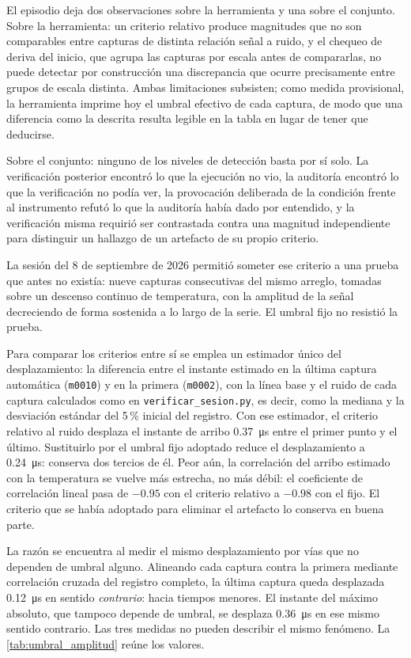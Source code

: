 El episodio deja dos observaciones sobre la herramienta y una sobre el
conjunto. Sobre la herramienta: un criterio relativo produce magnitudes
que no son comparables entre capturas de distinta relación señal a
ruido, y el chequeo de deriva del inicio, que agrupa las capturas por
escala antes de compararlas, no puede detectar por construcción una
discrepancia que ocurre precisamente entre grupos de escala distinta.
Ambas limitaciones subsisten; como medida provisional, la herramienta
imprime hoy el umbral efectivo de cada captura, de modo que una
diferencia como la descrita resulta legible en la tabla en lugar de
tener que deducirse.

Sobre el conjunto: ninguno de los niveles de detección basta por
sí solo. La verificación posterior encontró lo que la ejecución no vio,
la auditoría encontró lo que la verificación no podía ver, la
provocación deliberada de la condición frente al instrumento refutó lo
que la auditoría había dado por entendido, y la verificación misma
requirió ser contrastada contra una magnitud independiente para
distinguir un hallazgo de un artefacto de su propio criterio.

La sesión del 8 de septiembre de 2026 permitió someter ese criterio a
una prueba que antes no existía: nueve capturas consecutivas del mismo
arreglo, tomadas sobre un descenso continuo de temperatura, con la
amplitud de la señal decreciendo de forma sostenida a lo largo de la
serie. El umbral fijo no resistió la prueba.

Para comparar los criterios entre sí se emplea un estimador único del
desplazamiento: la diferencia entre el instante estimado en la última
captura automática (\texttt{m0010}) y en la primera (\texttt{m0002}),
con la línea base y el ruido de cada captura calculados como en
\texttt{verificar\_sesion.py}, es decir, como la mediana y la
desviación estándar del 5\,\% inicial del registro. Con ese estimador,
el criterio relativo al ruido desplaza el instante de arribo
\SI{0.37}{\micro\second} entre el primer punto y el último. Sustituirlo
por el umbral fijo adoptado reduce el desplazamiento a
\SI{0.24}{\micro\second}: conserva dos tercios de él. Peor aún, la
correlación del arribo estimado con la temperatura se vuelve más
estrecha, no más débil: el coeficiente de correlación lineal pasa de
$-0.95$ con el criterio relativo a $-0.98$ con el fijo. El criterio que
se había adoptado para eliminar el artefacto lo conserva en buena
parte.

La razón se encuentra al medir el mismo desplazamiento por vías que no
dependen de umbral alguno. Alineando cada captura contra la primera
mediante correlación cruzada del registro completo, la última captura
queda desplazada \SI{0.12}{\micro\second} en sentido
\emph{contrario}: hacia tiempos menores. El instante del máximo
absoluto, que tampoco depende de umbral, se desplaza
\SI{0.36}{\micro\second} en ese mismo sentido contrario. Las tres
medidas no pueden describir el mismo fenómeno. La
\cref{tab:umbral_amplitud} reúne los valores.

